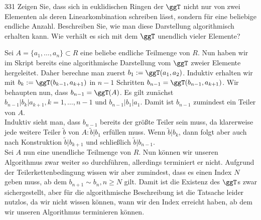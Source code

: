 \begin{algebraUE}{331}
Zeigen Sie, dass sich in euklidischen Ringen der $\ggT$ nicht nur von zwei
Elementen als deren Linearkombination schreiben lässt, sondern für eine
beliebige endliche Anzahl. Beschreiben Sie, wie man diese Darstellung
algorithmisch erhalten kann. Wie verhält es sich mit dem $\ggT$ unendlich
vieler Elemente?
\end{algebraUE}
\begin{solution}
Sei $A = \{a_1,\dots,a_n\} \subset R$ eine beliebe endliche Teilmenge von $R$.
Nun haben wir im Skript bereits eine algorithmische Darstellung vom
$\ggT$ zweier Elemente hergeleitet.
Daher berechne man zuerst $b_1 := \ggT(a_1,a_2)$.
Induktiv erhalten wir mit $b_k := \ggT(b_{k-1},a_{k+1})$
in $n - 1$ Schritten $b_{n-1} = \ggT(b_{n-1},a_{k+1})$.
Wir behaupten nun, dass $b_{n-1} = \ggT(A)$.
Es gilt zunächst $b_{n-1} | b_k | a_{k+1}, k = 1,\dots,n-1$ und $b_{n-1} | b_1 | a_1$.
Damit ist $b_{n-1}$ zumindest ein Teiler von $A$. \\
Induktiv sieht man, dass $b_{n-1}$ bereits der größte Teiler sein muss,
da klarerweise jede weitere Teiler $\widetilde{b}$ von $A: \widetilde{b} | b_1$
erfüllen muss.
Wenn $\widetilde{b} | b_k$, dann folgt aber auch nach Konstruktion $\widetilde{b} | b_{k+1}$
und schließlich $\widetilde{b} | b_{n-1}$. \\
Sei $A$ nun eine unendliche Teilmenge von $R$. Nun können wir unseren Algorithmus
zwar weiter so durchführen, allerdings terminiert er nicht.
Aufgrund der Teilerkettenbedingung wissen wir aber zumindest, dass es einen
Index $N$ geben muss, ab dem $b_{n+1} \sim b_{n}, n \geq N$ gilt.
Damit ist die Existenz des $\ggT$s zwar sichergestellt,
aber für die algorithmische Beschreibung ist die Tatsache leider nutzlos, da
wir nicht wissen können, wann wir den Index erreicht haben, ab dem wir
unseren Algorithmus terminieren können.
\end{solution}
